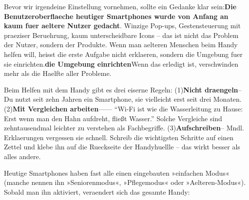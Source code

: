 


Bevor wir irgendeine Einstellung vornehmen, sollte ein Gedanke klar sein:\textbf{Die Benutzeroberflaeche heutiger Smartphones wurde von Anfang an kaum fuer aeltere Nutzer gedacht}. Winzige Pop-ups, Gestensteuerung mit praeziser Beruehrung, kaum unterscheidbare Icons – das ist nicht das Problem der Nutzer, sondern der Produkte. Wenn man aelteren Menschen beim Handy helfen will, heisst die erste Aufgabe nicht erklaeren, sondern die Umgebung fuer sie einrichten.\textbf{die Umgebung einrichten}Wenn das erledigt ist, verschwinden mehr als die Haelfte aller Probleme.

Beim Helfen mit dem Handy gibt es drei eiserne Regeln: (1)\textbf{Nicht draengeln}– Du nutzt seit zehn Jahren ein Smartphone, sie vielleicht erst seit drei Monaten. (2)\textbf{Mit Vergleichen arbeiten}—— “Wi-Fi ist wie die Wasserleitung zu Hause: Erst wenn man den Hahn aufdreht, fließt Wasser.” Solche Vergleiche sind zehntausendmal leichter zu verstehen als Fachbegriffe. (3)\textbf{Aufschreiben}– Mndl. Erklaerungen vergessen sie schnell. Schreib die wichtigsten Schritte auf einen Zettel und klebe ihn auf die Rueckseite der Handyhuellle – das wirkt besser als alles andere.


Heutige Smartphones haben fast alle einen eingebauten »einfachen Modus« (manche nennen ihn »Seniorenmodus«, »Pflegemodus« oder »Aelteren-Modus«). Sobald man ihn aktiviert, veraendert sich das gesamte Handy:

